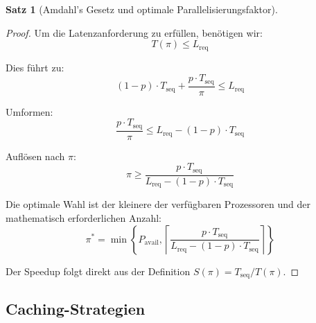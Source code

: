 \documentclass[a4paper,11pt]{article}
\theoremstyle{definition}
\newtheorem{satz}{Satz}
\newenvironment{beweis}{\begin{proof}}{\end{proof}}
\begin{document}
\begin{satz}[Amdahl's Gesetz und optimale Parallelisierungsfaktor]
\begin{beweis}
        Um die Latenzanforderung zu erfüllen, benötigen wir:
        \[
            T(\pi) \leq L_{\text{req}}
        \]

        Dies führt zu:
        \[
            (1-p) \cdot T_{\text{seq}} + \frac{p \cdot T_{\text{seq}}}{\pi} \leq L_{\text{req}}
        \]

        Umformen:
        \[
            \frac{p \cdot T_{\text{seq}}}{\pi} \leq L_{\text{req}} - (1-p) \cdot T_{\text{seq}}
        \]

        Auflösen nach $\pi$:
        \[
            \pi \geq \frac{p \cdot T_{\text{seq}}}{L_{\text{req}} - (1-p) \cdot T_{\text{seq}}}
        \]

        Die optimale Wahl ist der kleinere der verfügbaren Prozessoren und der mathematisch 
        erforderlichen Anzahl:
        \[
            \pi^* = \min \left\{ P_{\text{avail}}, \left\lceil \frac{p \cdot T_{\text{seq}}}{L_{\text{req}} - (1-p) \cdot T_{\text{seq}}} \right\rceil \right\}
        \]

        Der Speedup folgt direkt aus der Definition $S(\pi) = T_{\text{seq}} / T(\pi)$.
    \end{beweis}
\end{satz}

\subsection{Caching-Strategien}
\end{document}
